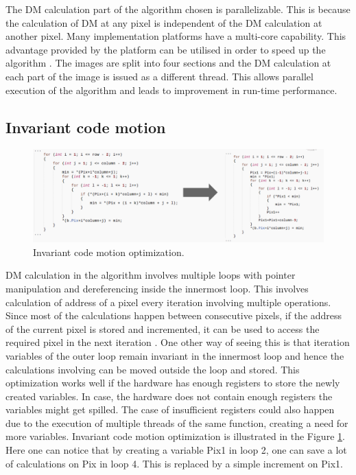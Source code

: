The DM calculation part of the algorithm chosen is parallelizable. This is because the calculation of DM at any pixel is independent of the DM calculation at another pixel. Many implementation platforms have a multi-core capability. This advantage provided by the platform can be utilised in order to speed up the algorithm \cite{threadcpp}. The images are split into four sections and the DM calculation at each part of the image is issued as a different thread. This allows parallel execution of the algorithm and leads to improvement in run-time performance.

\subsection{Invariant code motion}
\label{s:optimizations:invariantcodemotion}

\begin{figure}[!htbp]
    \center
    \includegraphics[width=\linewidth]{figures/icmoptimization}
    \caption{Invariant code motion optimization.}
    \label{fig:icmoptimization}
\end{figure}

DM calculation in the algorithm involves multiple loops with pointer manipulation and dereferencing inside the innermost loop. This involves calculation of address of a pixel every iteration involving multiple operations. Since most of the calculations happen between consecutive pixels, if the address of the current pixel is stored and incremented, it can be used to access the required pixel in the next iteration \cite{Aho2006}. One other way of seeing this is that iteration variables of the outer loop remain invariant in the innermost loop and hence the calculations involving can be moved outside the loop and stored. This optimization works well if the hardware has enough registers to store the newly created variables. In case, the hardware does not contain enough registers the variables might get spilled. The case of insufficient registers could also happen due to the execution of multiple threads of the same function, creating a need for more variables. Invariant code motion optimization is illustrated in the Figure \ref{fig:icmoptimization}. Here one can notice that by creating a variable Pix1 in loop 2, one can save a lot of calculations on Pix in loop 4. This is replaced by a simple increment on Pix1.

